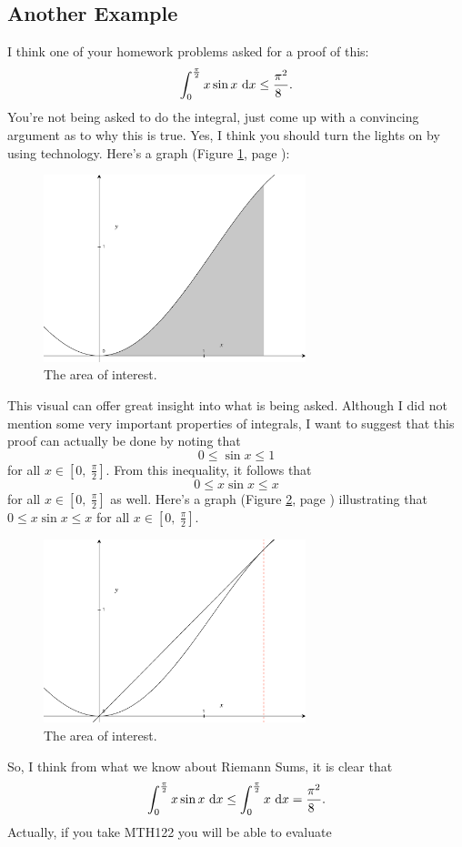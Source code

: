 \documentclass[12pt,addpoints, answers, fleqn]{exam}
\begin{document}
\subsection{Another Example}
I think one of your homework problems asked for a proof of this:
\[
\int_0^{\frac{\pi}{2}} x \sin x \ {\rm{d}}x \leq \frac{\pi^2}{8^{\phantom{2}}}.
\]
You're not being asked to do the integral, just come up with a convincing argument as to why this is true. Yes, I think you should turn the lights on by using technology. Here's a graph (Figure \ref{fig:graph3201}, page \pageref{fig:graph3201}):
\begin{figure}[htbp] %
   \centering
   \includegraphics[width=3in]{./graphics/graph3201.pdf} 
   \caption{The area of interest.}
   \label{fig:graph3201}
\end{figure}

This visual can offer great insight into what is being asked. Although I did not mention some very important properties of integrals, I want to suggest that this proof can actually be done by noting that
\[
0 \leq \sin x \leq 1
\]
for all $x \in \left[0, \ \frac{\pi}{2} \right]$. From this inequality, it follows that
\[
0 \leq x \sin x \leq x
\]
for all $x \in \left[0, \ \frac{\pi}{2} \right]$ as well. Here's a graph  (Figure \ref{fig:graph3202}, page \pageref{fig:graph3202}) illustrating that $0 \leq x \sin x \leq x$ for all $x \in \left[0, \ \frac{\pi}{2} \right]$.
\begin{figure}[htbp] %
   \centering
   \includegraphics[width=3in]{./graphics/graph3202.pdf} 
   \caption{The area of interest.}
   \label{fig:graph3202}
\end{figure}
So, I think from what we know about Riemann Sums, it is clear that
\[
\int_0^{\frac{\pi}{2}} x \sin x \ {\rm{d}}x \leq \int_0^{\frac{\pi}{2}} x \ {\rm{d}}x = \frac{\pi^2}{8^{\phantom{2}}}.
\] 
Actually, if you take MTH122 you will be able to evaluate
\end{document}
